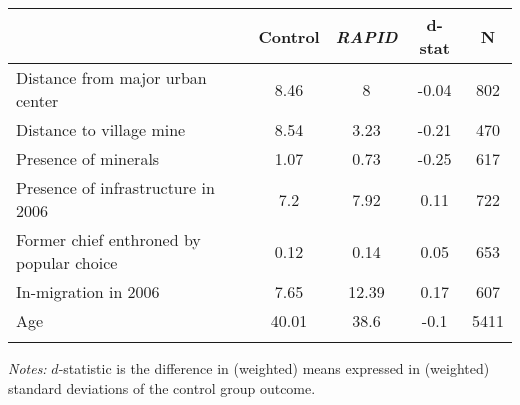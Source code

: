 \begin{tabular}{lcccc}  
 	&	Control	&	\textit{RAPID}	&	d-stat	&	N	 \\ \hline \hline  
 Distance from major urban center&8.46&8&-0.04&802 \\  
 Distance to village mine&8.54&3.23&-0.21&470 \\  
 Presence of minerals&1.07&0.73&-0.25&617 \\  
 Presence of infrastructure in 2006&7.2&7.92&0.11&722 \\  
 Former chief enthroned by popular choice&0.12&0.14&0.05&653 \\  
 In-migration in 2006&7.65&12.39&0.17&607 \\  
 Age&40.01&38.6&-0.1&5411 \\  
 \hline \hline  
 \label{table_balance}  
 \end{tabular}  
 \begin{flushleft}\textit{Notes:} $d$-statistic is the difference in (weighted) means expressed in (weighted) standard deviations of the control group outcome.\end{flushleft}  
